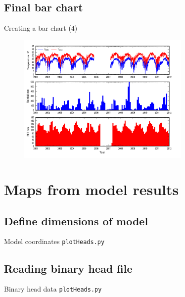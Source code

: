 \documentclass[t]{beamer}
\begin{document}
\subsection{Final bar chart}
	\begin{frame}{Creating a bar chart (4)}
		\vspace{-15pt}\begin{figure}[ht]
		\centering
		\includegraphics[width=0.75\textwidth]{figures/MeterologicBar.png}
	\end{figure}
\end{frame}

\section{Maps from model results}
\subsection{Define dimensions of model}
	\begin{frame}{Model coordinates}
		\small{\texttt{plotHeads.py}}
		\vspace{-15pt}\begin{figure}[ht]
		\centering
		\lstset{numbers=left}
		
	\end{figure}
\end{frame}

\subsection{Reading binary head file}
\begin{frame}{Binary head data}
	\small{\texttt{plotHeads.py}}
	\vspace{-15pt}\begin{figure}[ht]
		\centering
		\lstset{numbers=left}
		
			
	\end{figure}
\end{frame}
\end{document}
